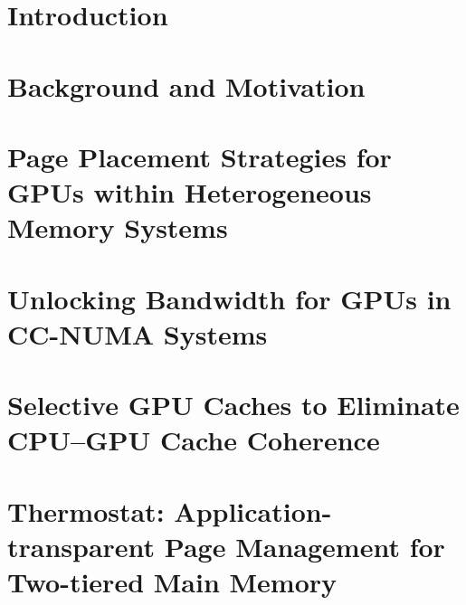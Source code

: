\documentclass[reqno,12pt,oneside]{report} %
\theoremstyle{plain}
\theoremstyle{definition}
\theoremstyle{remark}
\numberwithin{theorem}{chapter}     %
\begin{document}
\startthechapters 

 \chapter{Introduction}
 \label{chap:intro}
 

 \chapter{Background and Motivation}
 \label{chap:background}
 

% 

 \chapter{Page Placement Strategies for GPUs within Heterogeneous
Memory Systems}
 \label{chap:asplos2015}
 

 \chapter{Unlocking Bandwidth for GPUs in CC-NUMA Systems}
 \label{chap:hpca2015}
 

 \chapter{Selective GPU Caches to Eliminate CPU--GPU Cache Coherence}
 \label{chap:hpca2016}
 

% 

 \chapter{Thermostat: Application-transparent Page Management for Two-tiered
Main Memory}
 \label{chap:thermostat}
 
\end{document}
